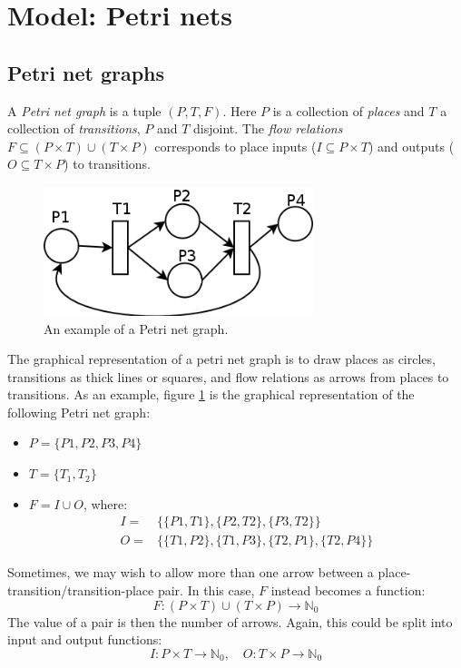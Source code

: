 \documentclass[12pt, a4paper]{article}
\numberwithin{equation}{section}
\begin{document}
\section{Model: Petri nets}

\subsection{Petri net graphs}
A \textit{Petri net graph} is a tuple $(P, T, F)$. Here $P$ is a collection of \textit{places} and $T$ a collection of \textit{transitions}, $P$ and $T$ disjoint. The \textit{flow relations} $F\subseteq(P\times T)\cup(T\times P)$ corresponds to place inputs ($I\subseteq P\times T$) and outputs ($O\subseteq T\times P$) to transitions.

\begin{figure}
\centering
\includegraphics[width=0.7\textwidth]{petri_graph}
\caption{An example of a Petri net graph.}
\label{fig:petri_graph}
\end{figure}

The graphical representation of a petri net graph is to draw places as circles, transitions as thick lines or squares, and flow relations as arrows from places to transitions. As an example, figure \ref{fig:petri_graph} is the graphical representation of the following Petri net graph:
\begin{itemize}
\item $P=\{P1, P2, P3, P4\}$
\item $T=\{T_1, T_2\}$
\item $F=I\cup O$, where:
\begin{align}
I=&\{\{P1, T1\}, \{P2, T2\}, \{P3, T2\}\}\\
O=&\{\{T1, P2\}, \{T1, P3\}, \{T2, P1\}, \{T2, P4\}\}
\end{align}
\end{itemize}

Sometimes, we may wish to allow more than one arrow between a place-transition/transition-place pair. In this case, $F$ instead becomes a function:
\begin{equation}
F: (P\times T)\cup(T\times P)\rightarrow\mathbb{N}_0
\end{equation}
The value of a pair is then the number of arrows. Again, this could be split into input and output functions:
\begin{equation}
I: P\times T\rightarrow\mathbb{N}_0,\quad
O: T\times P\rightarrow\mathbb{N}_0
\end{equation}
\end{document}
